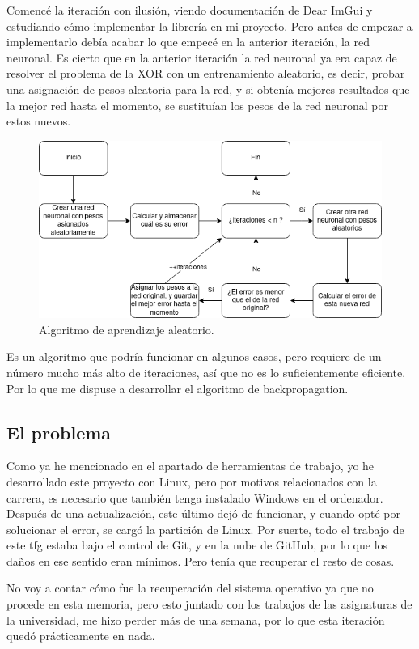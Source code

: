 Comencé la iteración con ilusión, viendo documentación de Dear ImGui y estudiando cómo implementar la librería en mi proyecto. Pero antes de empezar a implementarlo debía acabar lo que empecé en la anterior iteración, la red neuronal. Es cierto que en la anterior iteración la red neuronal ya era capaz de resolver el problema de la XOR con un entrenamiento aleatorio, es decir, probar una asignación de pesos aleatoria para la red, y si obtenía mejores resultados que la mejor red hasta el momento, se sustituían los pesos de la red neuronal por estos nuevos.
\begin{figure}[h]
	\centering
	\includegraphics[width=15cm]{archivos/imagenes/Algoritmo-red-neuronal-aleatorio.png}
	\caption{Algoritmo de aprendizaje aleatorio.}
\end{figure}
Es un algoritmo que podría funcionar en algunos casos, pero requiere de un número mucho más alto de iteraciones, así que no es lo suficientemente eficiente. Por lo que me dispuse a desarrollar el algoritmo de backpropagation.

\subsection{El problema}
Como ya he mencionado en el apartado de herramientas de trabajo, yo he desarrollado este proyecto con Linux, pero por motivos relacionados con la carrera, es necesario que también tenga instalado Windows en el ordenador. Después de una actualización, este último dejó de funcionar, y cuando opté por solucionar el error, se cargó la partición de Linux. Por suerte, todo el trabajo de este \gls{tfg} estaba bajo el control de Git, y en la nube de GitHub, por lo que los daños en ese sentido eran mínimos. Pero tenía que recuperar el resto de cosas.

No voy a contar cómo fue la recuperación del sistema operativo ya que no procede en esta memoria, pero esto juntado con los trabajos de las asignaturas de la universidad, me hizo perder más de una semana, por lo que esta iteración quedó prácticamente en nada.

